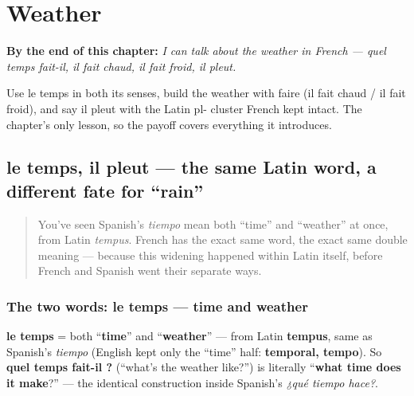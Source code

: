 
\chapter{Weather}
\label{ch:fr-weather}

\begin{chapteropening}
\textbf{By the end of this chapter:} \emph{I can talk about the weather in French — quel temps fait-il, il fait chaud, il fait froid, il pleut.}

Use le temps in both its senses, build the weather with faire (il fait chaud / il fait froid), and say il pleut with the Latin pl- cluster French kept intact. The chapter's only lesson, so the payoff covers everything it introduces.
\end{chapteropening}

\section[le temps, il pleut]{le temps, il pleut — the same Latin word, a different fate for \textquotedblleft{}rain\textquotedblright{}}

\label{lesson:FR-C21-le-temps}



\begin{quote}
You've seen Spanish's \emph{tiempo} mean both \textquotedblleft{}time\textquotedblright{} and \textquotedblleft{}weather\textquotedblright{} at once, from Latin \emph{tempus}. French has the exact same word, the exact same double meaning — because this widening happened within Latin itself, before French and Spanish went their separate ways.
\end{quote}

\subsection*{The two words: le temps — time and weather}
\textbf{le temps} = both \textquotedblleft{}\textbf{time}\textquotedblright{} and \textquotedblleft{}\textbf{weather}\textquotedblright{} — from Latin \textbf{tempus}, same as Spanish's \emph{tiempo} (English kept only the \textquotedblleft{}time\textquotedblright{} half: \textbf{temporal, tempo}). So \textbf{quel temps fait-il ?} (\textquotedblleft{}what's the weather like?\textquotedblright{}) is literally \textquotedblleft{}\textbf{what time does it make}?\textquotedblright{} — the identical construction inside Spanish's \emph{¿qué tiempo hace?}.

